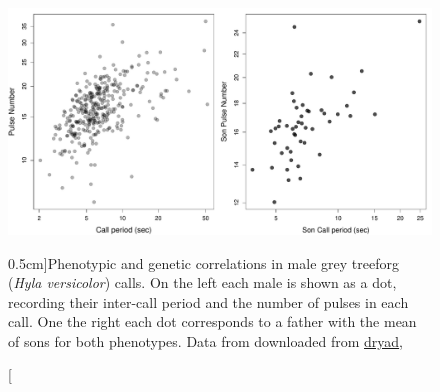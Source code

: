 \begin{figure}
\begin{center}
\includegraphics[width= \textwidth]{Journal_figs/Quant_gen/Frog_calls_Hyla_versicolor/Frog_calls_sibling_means.pdf}
\end{center}
\caption[][0.5cm]{Phenotypic and genetic correlations in male grey treeforg
  ({\it Hyla versicolor}) calls. On the left each male is shown as a
  dot, recording their inter-call period and the number of pulses in each call. One
  the right each dot corresponds to a father with the mean of sons
  for both phenotypes. Data from \citet{welch2014multivariate} downloaded from
\href{https://datadryad.org/stash/dataset/doi:10.5061/dryad.40sj6}{dryad}, } \label{fig:Frog_genetic_corr}  
\end{figure}


